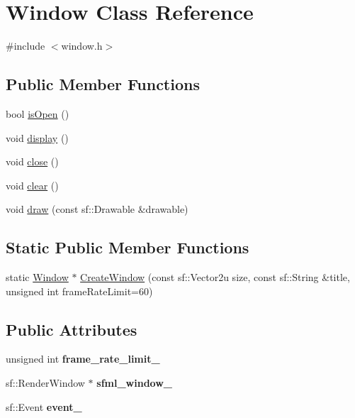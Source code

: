 \hypertarget{class_window}{}\section{Window Class Reference}
\label{class_window}


{\ttfamily \#include $<$window.\+h$>$}

\subsection*{Public Member Functions}
\begin{DoxyCompactItemize}
\item 
bool \hyperlink{class_window_a0530ead23b2c91ef90a5f98e4df41cb8}{is\+Open} ()
\item 
void \hyperlink{class_window_afadfafa5a0b9472554759004aafb327e}{display} ()
\item 
void \hyperlink{class_window_a35055c04498121d39741bfcd5082705b}{close} ()
\item 
void \hyperlink{class_window_a38bc43bdd1a97e5de7f346ba4c3957ef}{clear} ()
\item 
void \hyperlink{class_window_adfb2d5826942693e289d13f314a341f7}{draw} (const sf\+::\+Drawable \&drawable)
\end{DoxyCompactItemize}
\subsection*{Static Public Member Functions}
\begin{DoxyCompactItemize}
\item 
static \hyperlink{class_window}{Window} $\ast$ \hyperlink{class_window_ac23ace79f02693ff5463f91dba8bb38b}{Create\+Window} (const sf\+::\+Vector2u size, const sf\+::\+String \&title, unsigned int frame\+Rate\+Limit=60)
\end{DoxyCompactItemize}
\subsection*{Public Attributes}
\begin{DoxyCompactItemize}
\item 
\mbox{\label{class_window_adf4fd93b0ad5bd9c045a4bbc5c767b7d}} 
unsigned int {\bfseries frame\+\_\+rate\+\_\+limit\+\_\+}
\item 
\mbox{\label{class_window_a49d4bbd674a3cef9ff823ef17a0bef42}} 
sf\+::\+Render\+Window $\ast$ {\bfseries sfml\+\_\+window\+\_\+}
\item 
\mbox{\label{class_window_a79a1f398d58121ef49bb7d29b3f2ea64}} 
sf\+::\+Event {\bfseries event\+\_\+}
\end{DoxyCompactItemize}
